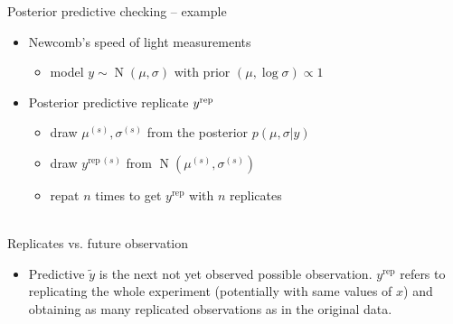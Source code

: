 \documentclass[t]{beamer}
\DeclareMathOperator{\N}{N}
\begin{document}
\begin{frame}[fragile]

  {\Large\color{navyblue} Posterior predictive checking -- example}

  \begin{itemize}
  \item<1-> Newcomb's speed of light measurements
    \begin{itemize}
    \item model $y\sim\N(\mu,\sigma)$ with prior $(\mu,\log\sigma)\propto 1$
    \end{itemize}
  \item<2-> Posterior predictive replicate $y^{\rm rep}$
    \begin{itemize}
    \item<3-> draw $\mu^{(s)},\sigma^{(s)}$ from the posterior $p(\mu,\sigma|y)$
    \item<4-> draw $y^{\mathrm{rep}\,(s)}$ from $\N(\mu^{(s)},\sigma^{(s)})$
    \item<5-> repat $n$ times to get $y^{\mathrm{rep}}$ with $n$ replicates\\~\\
      \end{itemize}
    \end{itemize}

\end{frame}

\begin{frame}

  {\Large\color{navyblue} Replicates vs. future observation}

  \begin{itemize}
  \item Predictive $\tilde{y}$ is the next not yet observed possible
    observation. $y^{\mathrm{rep}}$ refers to replicating the whole
    experiment (potentially with same values of $x$) and obtaining as
    many replicated observations as in the original data.
  \end{itemize}

\end{frame}
\end{document}
